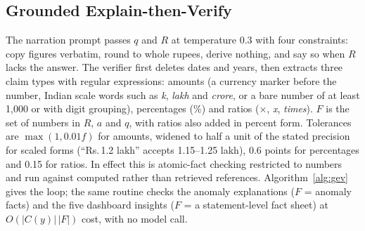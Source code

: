 \documentclass[conference]{IEEEtran}
\DeclareRobustCommand{\rupee}{Rs.\,}
\begin{document}
\begin{table}[t]
\caption{Typed analytics tools available to the router}
\label{tab:tools}
\centering
{}
\end{table}

\subsection{Grounded Explain-then-Verify}
The narration prompt passes $q$ and $R$ at temperature 0.3 with four constraints: copy figures verbatim, round to whole rupees, derive nothing, and say so when $R$ lacks the answer. The verifier first deletes dates and years, then extracts three claim types with regular expressions: amounts (a currency marker before the number, Indian scale words such as \emph{k}, \emph{lakh} and \emph{crore}, or a bare number of at least 1,000 or with digit grouping), percentages (\%) and ratios ($\times$, \emph{x}, \emph{times}). $F$ is the set of numbers in $R$, $a$ and $q$, with ratios also added in percent form. Tolerances are $\max(1, 0.01f)$ for amounts, widened to half a unit of the stated precision for scaled forms (``\rupee 1.2 lakh'' accepts 1.15--1.25 lakh), 0.6 points for percentages and 0.15 for ratios. In effect this is atomic-fact checking \cite{min2023factscore} restricted to numbers and run against computed rather than retrieved references. Algorithm~\ref{alg:gev} gives the loop; the same routine checks the anomaly explanations ($F$ = anomaly facts) and the five dashboard insights ($F$ = a statement-level fact sheet) at $O(|C(y)|\,|F|)$ cost, with no model call.
\end{document}
